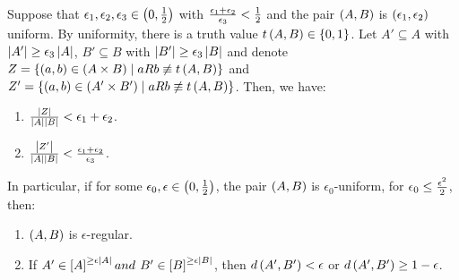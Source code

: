     \lemma[Lemma 5.17]\label{excellence_implies_regularity}
        Suppose that $\epsilon_1, \epsilon_2, \epsilon_3 \in \left( 0, {1 \over 2} \right)$ with
        ${{\epsilon_1 + \epsilon_2} \over \epsilon_3} < {1 \over 2}$ and the pair $\left( A,B \right)$ is
        $\left( \epsilon_1, \epsilon_2 \right)$uniform.
        By uniformity, there is a truth value $t\left( A,B \right) \in \left\{ 0,1 \right\}$.
        Let $A' \subseteq A$ with $\left| A' \right| \geq \epsilon_3 \left| A \right|$,
        $B' \subseteq B$ with $\left| B' \right| \geq \epsilon_3 \left| B \right|$ and
        denote $Z = \left\{ \left( a,b \right) \in \left( A \times B \right) \mid a R b \not\equiv t\left( A,B \right) \right\}$ and
        $Z' = \left\{ \left( a,b \right) \in \left( A' \times B' \right) \mid a R b \not\equiv t\left( A,B \right) \right\}$.
        Then, we have:
        \begin{enumerate}
            \item \label{itm:5.17.1} ${\left| Z \right| \over {\left| A \right| \left| B \right|}} < \epsilon_1 + \epsilon_2$.
            \item \label{itm:5.17.2} ${\left| Z' \right| \over {\left| A \right| \left| B \right|}} <
                {{\epsilon_1 + \epsilon_2} \over \epsilon_3}$.
        \end{enumerate}
        In particular, if for some $\epsilon_0, \epsilon \in \left( 0, {1 \over 2} \right)$, the pair
        $\left( A,B \right)$ is $\epsilon_0$-uniform, for $\epsilon_0 \leq {{\epsilon^2} \over 2}$, then:
        \begin{enumerate}[label=\alph*., ref=\alph*]
            \item \label{itm:5.17.a} $\left( A,B \right)$ is $\epsilon$-regular.
            \item \label{itm:5.17.b} If $A' \in \left[ A \right]^{\geq \epsilon \left| A \right|} and $
                $B' \in \left[ B \right]^{\geq \epsilon \left| B \right|}$, then $d \left( A',B' \right) < \epsilon$ or
                $d \left( A',B' \right) \geq 1 - \epsilon$.
        \end{enumerate}
